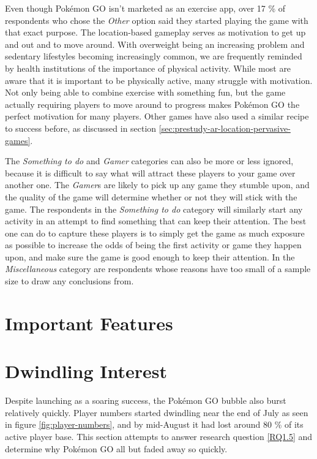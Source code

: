 Even though Pokémon GO isn't marketed as an exercise app, over 17 \% of respondents who chose the \emph{Other} option said they started playing the game with that exact purpose. The location-based gameplay serves as motivation to get up and out and to move around. With overweight being an increasing problem and sedentary lifestyles becoming increasingly common, we are frequently reminded by health institutions of the importance of physical activity. While most are aware that it is important to be physically active, many struggle with motivation. Not only being able to combine exercise with something fun, but the game actually requiring players to move around to progress makes Pokémon GO the perfect motivation for many players. Other games have also used a similar recipe to success before, as discussed in section \ref{sec:prestudy-ar-location-pervasive-games}. 

The \emph{Something to do} and \emph{Gamer} categories can also be more or less ignored, because it is difficult  to say what will attract these players to your game over another one. The \emph{Gamer}s are likely to pick up any game they stumble upon, and the quality of the game will determine whether or not they will stick with the game. The respondents in the \emph{Something to do} category will similarly start any activity in an attempt to find something that can keep their attention. The best one can do to capture these players is to simply get the game as much exposure as possible to increase the odds of being the first activity or game they happen upon, and make sure the game is good enough to keep their attention. In the \emph{Miscellaneous} category are respondents whose reasons have too small of a sample size to draw any conclusions from.

\section{Important Features}
\label{sec:success-factors-features}


\section{Dwindling Interest}

Despite launching as a soaring success, the Pokémon GO bubble also burst relatively quickly. Player numbers started dwindling near the end of July as seen in figure \ref{fig:player-numbers}, and by mid-August it had lost around 80 \%  of its active player base. This section attempts to answer research question \ref{RQ1.5} and determine why Pokémon GO all but faded away so quickly.


